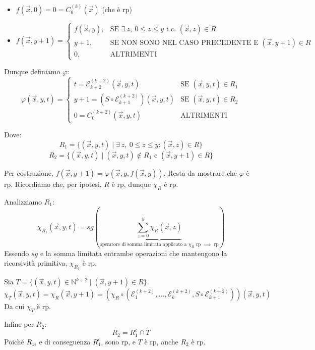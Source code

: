 \begin{itemize}
    \item $f(\vec{x}, 0) = 0 = C_0^{(k)}(\vec{x})$ \quad (che è rp)
    \item $f(\vec{x}, y+1) = \begin{cases} f(\vec{x}, y), & \text{SE } \exists\ z, \ 0 \le z \le y \text{ t.c. } (\vec{x}, z) \in R \\ y+1, & \text{SE NON SONO NEL CASO PRECEDENTE E } (\vec{x}, y+1) \in R \\ 0, & \text{ALTRIMENTI} \end{cases}$
\end{itemize}

Dunque definiamo $\varphi$:
$$
\varphi(\vec{x}, y, t) = 
\begin{cases} 
t = \mathcal{E}_{k+2}^{(k+2)}(\vec{x}, y, t) & \text{SE } (\vec{x}, y, t) \in R_1 \\ 
y+1 = (S \circ \mathcal{E}_{k+1}^{(k+2)})(\vec{x}, y, t) & \text{SE } (\vec{x}, y, t) \in R_2 \\ 
0 = C_0^{(k+2)}(\vec{x}, y, t) & \text{ALTRIMENTI} 
\end{cases}
$$

Dove:
$$ R_1 = \{ (\vec{x}, y, t) \mid \exists\ z, \ 0 \le z \le y : (\vec{x}, z) \in R \} $$
$$ R_2 = \{ (\vec{x}, y, t) \mid (\vec{x}, y, t) \notin R_1 \text{ e } (\vec{x}, y+1) \in R \} $$

Per costruzione, $f(\vec{x}, y+1) = \varphi(\vec{x}, y, f(\vec{x}, y))$. Resta da mostrare che $\varphi$ è rp. 
Ricordiamo che, per ipotesi, $R$ è rp, dunque $\chi_R$ è rp.

Analizziamo $R_1$:
$$ \chi_{R_1}(\vec{x}, y, t) = sg \left( \underbrace{ \sum_{z=0}^{y} \chi_R(\vec{x}, z) }_{\text{operatore di somma limitata applicato a } \chi_R \text{ rp } \implies \text{ rp}} \right) $$
Essendo $sg$ e la somma limitata entrambe operazioni che mantengono la ricorsività primitiva, $\chi_{R_1}$ è rp.

Sia $T = \{ (\vec{x}, y, t) \in \mathbb{N}^{k+2} \mid (\vec{x}, y+1) \in R \}$.
$$ \chi_T(\vec{x}, y, t) = \chi_R(\vec{x}, y+1) = \left( \chi_R \circ (\mathcal{E}_1^{(k+2)}, \dots, \mathcal{E}_k^{(k+2)}, S \circ \mathcal{E}_{k+1}^{(k+2)}) \right)(\vec{x}, y, t) $$
Da cui $\chi_T$ è rp.

Infine per $R_2$:
$$ R_2 = R_1^c \cap T $$
Poiché $R_1$, e di conseguenza $R_1^c$, sono rp, e $T$ è rp, anche $R_2$ è rp.

